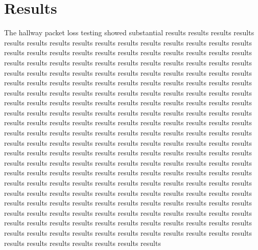 \documentclass[letterpaper, 11pt]{article}
\begin{document}
\section{Results}
\begin{multicols}{2}
The hallway packet loss testing showed substantial results 
results results results results results results results results results results
results results results results results results results results results results
results results results results results results results results results results
results results results results results results results results results results
results results results results results results results results results results
results results results results results results results results results results
results results results results results results results results results results
results results results results results results results results results results
results results results results results results results results results results
results results results results results results results results results results
results results results results results results results results results results
results results results results results results results results results results
results results results results results results results results results results
results results results results results results results results results results
results results results results results results results results results results
results results results results results results results results results results
results results results results results results results results results results
results results results results results results results results results results
results results results results results results results results results results
results results results results results results results results results results
results results results results results results results results results results
results results results results results results results results results results
results results results results results results results results results results
\end{multicols}
\end{document}
